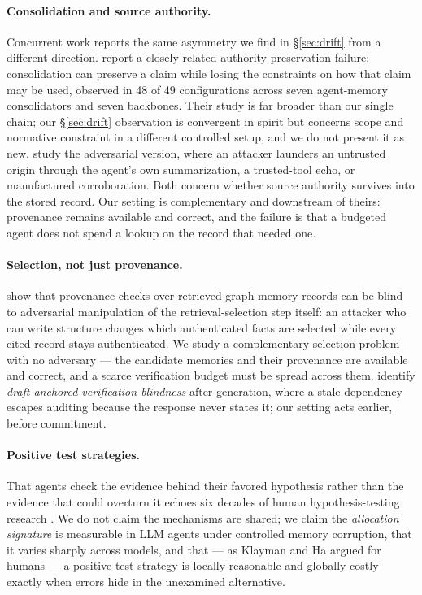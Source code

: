 \documentclass[11pt]{article}
\begin{document}
\paragraph{Consolidation and source authority.} Concurrent work reports the
same asymmetry we find in \S\ref{sec:drift} from a different direction.
\citet{zhan2026authority} report a closely related authority-preservation
failure: consolidation can preserve a claim while losing the constraints on how
that claim may be used, observed in 48 of 49 configurations across seven
agent-memory consolidators and seven backbones. Their study is far broader than
our single chain; our \S\ref{sec:drift} observation is convergent in spirit
but concerns scope and normative constraint in a different controlled setup, and
we do not present it as new.
\citet{louck2026securing} study the adversarial version, where an attacker
launders an untrusted origin through the agent's own summarization, a
trusted-tool echo, or manufactured corroboration. Both concern whether source
authority survives into the stored record. Our setting is complementary and
downstream of theirs: provenance remains available and correct, and the failure
is that a budgeted agent does not spend a lookup on the record that needed one.

\paragraph{Selection, not just provenance.} \citet{fei2026selection} show that
provenance checks over retrieved graph-memory records can be blind to
adversarial manipulation of the retrieval-selection step itself: an attacker who
can write structure changes which authenticated facts are selected while every
cited record stays authenticated. We study a complementary selection problem
with no adversary --- the candidate memories and their provenance are available
and correct, and a scarce verification budget must be spread across them.
\citet{sun2026memory} identify \emph{draft-anchored verification blindness}
after generation, where a stale dependency escapes auditing because the response
never states it; our setting acts earlier, before commitment.

\paragraph{Positive test strategies.}
That agents check the evidence behind their favored hypothesis rather than the
evidence that could overturn it echoes six decades of human hypothesis-testing
research \citep{wason1960, klayman1987}. We do not claim the mechanisms are
shared; we claim the \emph{allocation signature} is measurable in LLM agents
under controlled memory corruption, that it varies sharply across models, and
that --- as Klayman and Ha argued for humans --- a positive test strategy is
locally reasonable and globally costly exactly when errors hide in the
unexamined alternative.
\end{document}
